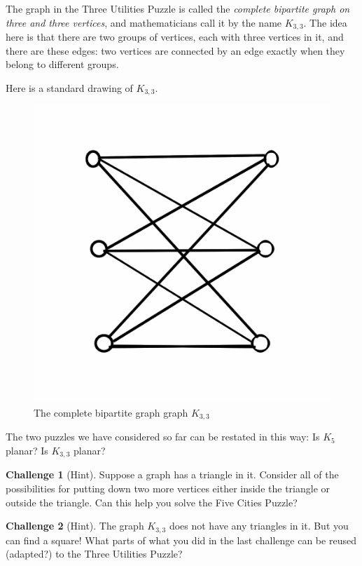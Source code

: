 \documentclass[12pt,letterpaper]{article}
\theoremstyle{definition}
\newtheorem*{challenge}{Challenge}
\begin{document}
The graph in the Three Utilities Puzzle is called the \emph{complete bipartite graph on three and three vertices},
and mathematicians call it by the name $K_{3,3}$. The idea here is that there are two groups of vertices, 
each with three vertices in it, and there are these edges: two vertices are connected by an edge exactly when they 
belong to different groups.

Here is a standard drawing of $K_{3,3}$.

\begin{figure}[h]
\centering
\includegraphics[width=.4\textwidth]{images/k3,3.png}
\caption{The complete bipartite graph graph $K_{3,3}$}
\label{figure:stdk33}
\end{figure}

The two puzzles we have considered so far can be restated in this way: Is $K_5$ planar? Is $K_{3,3}$ planar?

\begin{challenge}[Hint] Suppose a graph has a triangle in it. Consider all of the possibilities for putting down 
two more vertices either inside the triangle or outside the triangle. Can this help you solve the Five Cities
Puzzle?
\end{challenge}

\begin{challenge}[Hint] The graph $K_{3,3}$ does not have any triangles in it. But you can find a square!
What parts of what you did in the last challenge can be reused (adapted?) to the Three Utilities Puzzle?
\end{challenge}



\end{document}

